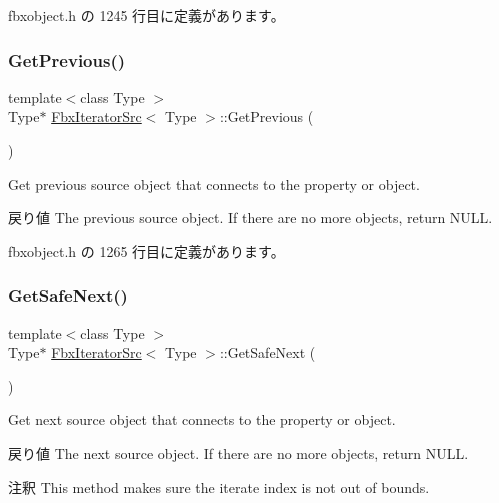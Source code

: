  fbxobject.\+h の 1245 行目に定義があります。

\mbox{\label{class_fbx_iterator_src_a8b7703e63be49c3210f5a71946437027}} 
\subsubsection{\texorpdfstring{Get\+Previous()}{GetPrevious()}}
{\footnotesize\ttfamily template$<$class Type $>$ \\
Type$\ast$ \hyperlink{class_fbx_iterator_src}{Fbx\+Iterator\+Src}$<$ Type $>$\+::Get\+Previous (\begin{DoxyParamCaption}{ }\end{DoxyParamCaption})\hspace{0.3cm}{\ttfamily [inline]}}

Get previous source object that connects to the property or object. \begin{DoxyReturn}{戻り値}
The previous source object. If there are no more objects, return N\+U\+LL. 
\end{DoxyReturn}


 fbxobject.\+h の 1265 行目に定義があります。

\mbox{\label{class_fbx_iterator_src_a530db83b2a4c20190bcdc7b7a9af2811}} 
\subsubsection{\texorpdfstring{Get\+Safe\+Next()}{GetSafeNext()}}
{\footnotesize\ttfamily template$<$class Type $>$ \\
Type$\ast$ \hyperlink{class_fbx_iterator_src}{Fbx\+Iterator\+Src}$<$ Type $>$\+::Get\+Safe\+Next (\begin{DoxyParamCaption}{ }\end{DoxyParamCaption})\hspace{0.3cm}{\ttfamily [inline]}}

Get next source object that connects to the property or object. \begin{DoxyReturn}{戻り値}
The next source object. If there are no more objects, return N\+U\+LL. 
\end{DoxyReturn}
\begin{DoxyRemark}{注釈}
This method makes sure the iterate index is not out of bounds. 
\end{DoxyRemark}


